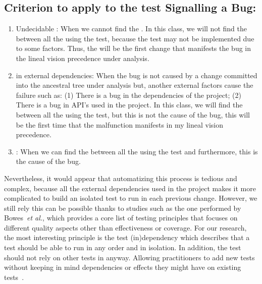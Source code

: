 \documentclass[a4paper, 12pt]{book}
\begin{document}
\subsection{Criterion to apply to the test Signalling a Bug:}
 \begin{enumerate}
	\item Undecidable \FFC : When we cannot find the \FFC. In this class, we will not find the \FFC between all the  using the test, because the test may not be implemented due to some factors. Thus, the \FFC will be the first change that manifests the bug in the lineal vision precedence under analysis.
	\item \FFC in external dependencies: When the bug is not caused by a change committed into the ancestral tree under analysis but, another external factors cause the failure such as: (1) There is a bug in the dependencies of the project; (2) There is a bug in API's used in the project. In this class, we will find the \FFC between all the  using the test, but this \FFC is not the cause of the bug, this \FFC will be the first time that the malfunction manifests in my lineal vision precedence.
	\item \FFC : When we can find the \FFC between all the  using the test and furthermore, this \FFC is the cause of the bug.
\end{enumerate}

Nevertheless, it would appear that automatizing this process is tedious and complex, because all the external dependencies used in the project makes it more complicated to build an isolated test to run in each previous change. However, we still rely this can be possible thanks to studies such as the one performed by Bowes~\emph{et al.}, which provides a core list of testing principles that focuses on different quality aspects other than effectiveness or coverage. For our research, the most interesting principle is the test (in)dependency which describes that a test should be able to run in any order and in isolation. In addition, the test should  not  rely  on other tests in anyway. Allowing practitioners to add new tests without keeping in mind dependencies or effects they might have on existing tests~\cite{bowes2017good}.
\end{document}
